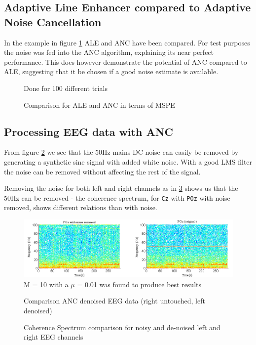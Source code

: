 \documentclass[10pt,twoside,a4paper]{report}
\begin{document}
\subsection{Adaptive Line Enhancer compared to Adaptive Noise Cancellation}
In the example in figure \ref{fig:3_3c} ALE and ANC have been compared. For test purposes the noise was fed into the ANC algorithm, explaining its near perfect performance. This does however demonstrate the potential of ANC compared to ALE, suggesting that it be chosen if a good noise estimate is available.
\begin{figure}[h]
\centering
\resizebox{\textwidth}{!}{}
Done for 100 different trials
\caption{Comparison for ALE and ANC in terms of MSPE}
\label{fig:3_3c}
\end{figure}

\subsection{Processing EEG data with ANC}

From figure \ref{fig:3_3d} we see that the 50Hz mains DC noise can easily be removed by generating a synthetic sine signal with added white noise. With a good LMS filter the noise can be removed without affecting the rest of the signal.

Removing the noise for both left and right channels as in \ref{fig:3_3d_2} shows us that the 50Hz can be removed - the coherence spectrum, for \texttt{Cz} with \texttt{POz} with noise removed, shows different relations than with noise.

\begin{figure}[h]
\centering
\includegraphics[width=\textwidth]{cw3im/3d_spectro.png}
M = 10 with a $\mu$ = 0.01 was found to produce best results
\caption{Comparison ANC denoised EEG data (right untouched, left denoised)}
\label{fig:3_3d}
\end{figure}

\begin{figure}[h]
\centering
\resizebox{\textwidth}{!}{}
\caption{Coherence Spectrum comparison for noisy and de-noised left and right EEG channels}
\label{fig:3_3d_2}
\end{figure}
\end{document}
